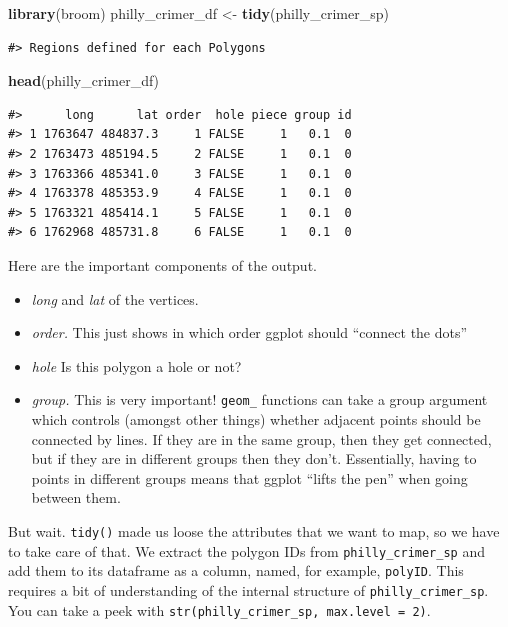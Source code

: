\documentclass[]{book}
\newenvironment{Shaded}{\begin{snugshade}}{\end{snugshade}}
\newcommand{\KeywordTok}[1]{\textcolor[rgb]{0.13,0.29,0.53}{\textbf{#1}}}
\newcommand{\StringTok}[1]{\textcolor[rgb]{0.31,0.60,0.02}{#1}}
\newcommand{\NormalTok}[1]{#1}
\providecommand{\tightlist}{%
  \setlength{\itemsep}{0pt}\setlength{\parskip}{0pt}}
\theoremstyle{definition}
\theoremstyle{definition}
\theoremstyle{definition}
\theoremstyle{remark}
\begin{document}
\begin{Shaded}
\begin{Highlighting}[]
\KeywordTok{library}\NormalTok{(broom)}
\NormalTok{philly_crimer_df <-}\StringTok{ }\KeywordTok{tidy}\NormalTok{(philly_crimer_sp)}
\end{Highlighting}
\end{Shaded}

\begin{verbatim}
#> Regions defined for each Polygons
\end{verbatim}

\begin{Shaded}
\begin{Highlighting}[]
\KeywordTok{head}\NormalTok{(philly_crimer_df)}
\end{Highlighting}
\end{Shaded}

\begin{verbatim}
#>      long      lat order  hole piece group id
#> 1 1763647 484837.3     1 FALSE     1   0.1  0
#> 2 1763473 485194.5     2 FALSE     1   0.1  0
#> 3 1763366 485341.0     3 FALSE     1   0.1  0
#> 4 1763378 485353.9     4 FALSE     1   0.1  0
#> 5 1763321 485414.1     5 FALSE     1   0.1  0
#> 6 1762968 485731.8     6 FALSE     1   0.1  0
\end{verbatim}

Here are the important components of the output.

\begin{itemize}
\tightlist
\item
  \emph{long} and \emph{lat} of the vertices.
\item
  \emph{order.} This just shows in which order ggplot should ``connect
  the dots''
\item
  \emph{hole} Is this polygon a hole or not?
\item
  \emph{group.} This is very important! \texttt{geom\_} functions can
  take a group argument which controls (amongst other things) whether
  adjacent points should be connected by lines. If they are in the same
  group, then they get connected, but if they are in different groups
  then they don't. Essentially, having to points in different groups
  means that ggplot ``lifts the pen'' when going between them.
\end{itemize}

But wait. \texttt{tidy()} made us loose the attributes that we want to
map, so we have to take care of that. We extract the polygon IDs from
\texttt{philly\_crimer\_sp} and add them to its dataframe as a column,
named, for example, \texttt{polyID}. This requires a bit of
understanding of the internal structure of \texttt{philly\_crimer\_sp}.
You can take a peek with
\texttt{str(philly\_crimer\_sp,\ max.level\ =\ 2)}.
\end{document}
